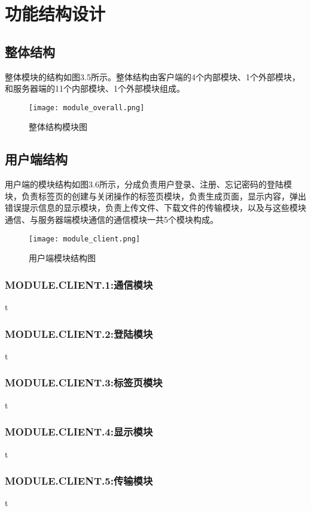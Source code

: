 \section{功能结构设计}
\subsection{整体结构}
整体模块的结构如图3.5所示。整体结构由客户端的4个内部模块、1个外部模块，和服务器端的11个内部模块、1个外部模块组成。

\begin{figure}[!ht] 
\centering 
\texttt{[image: module\_overall.png]} 
\caption{整体结构模块图}\label{fig:noted-figure}
\end{figure}

\subsection{用户端结构}
用户端的模块结构如图3.6所示，分成负责用户登录、注册、忘记密码的登陆模块，负责标签页的创建与关闭操作的标签页模块，负责生成页面，显示内容，弹出错误提示信息的显示模块，负责上传文件、下载文件的传输模块，以及与这些模块通信、与服务器端模块通信的通信模块一共5个模块构成。
\begin{figure}[!h]  
\centering 
\texttt{[image: module\_client.png]} 
\caption{用户端模块结构图}\label{fig:noted-figure}
\end{figure}

\subsubsection{MODULE.CLIENT.1:通信模块}
t

\subsubsection{MODULE.CLIENT.2:登陆模块}
t

\subsubsection{MODULE.CLIENT.3:标签页模块}
t

\subsubsection{MODULE.CLIENT.4:显示模块}
t

\subsubsection{MODULE.CLIENT.5:传输模块}
t





